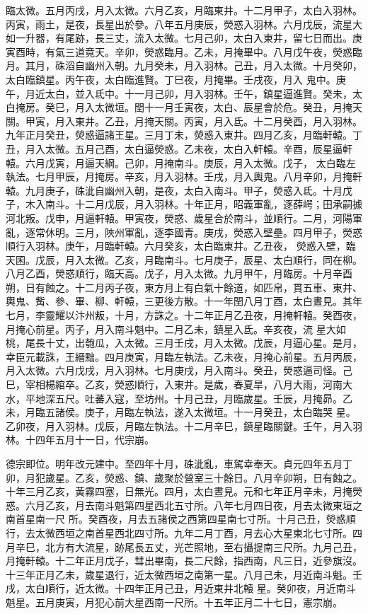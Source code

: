 \begin{pinyinscope}
 臨太微。五月丙戌，月入太微。六月乙亥，月臨東井。十二月甲子，太白入羽林。丙寅，雨土，是夜，長星出於參。八年五月庚辰，熒惑入羽林。六月戊辰，流星大如一升器，有尾跡，長三丈，流入太微。七月己卯，太白入東井，留七日而出。庚寅酉時，有氣三道竟天。辛卯，熒惑臨月。乙未，月掩畢中。八月戊午夜，熒惑臨月。其月，硃滔自幽州入朝。九月癸未，月入羽林。己丑，月入太微。十月癸卯，太白臨鎮星。丙午夜，太白臨進賢。丁巳夜，月掩畢。壬戌夜，月入
 鬼中。庚午，月近太白，並入氐中。十一月己卯，月入羽林。壬午，鎮星逼進賢。癸未，太白掩房。癸巳，月入太微垣。閏十一月壬寅夜，太白、辰星會於危。癸丑，月掩天關。甲寅，月入東井。乙丑，月掩天關。丙寅，月入氐。十二月癸酉，月入羽林。九年正月癸丑，熒惑逼諸王星。三月丁未，熒惑入東井。四月乙亥，月臨軒轅。丁丑，月入太微。五月己酉，太白逼熒惑。乙未夜，太白入軒轅。辛酉，辰星逼軒轅。六月戊寅，月逼天綱。己卯，月掩南斗。庚辰，月入太微。戊子，
 太白臨左執法。七月甲辰，月掩房。辛亥，月入羽林。壬戌，月入輿鬼。八月辛卯，月掩軒轅。九月庚子，硃泚自幽州入朝，是夜，太白入南斗。甲子，熒惑入氐。十月戊子，木入南斗。十二月戊辰，月入羽林。十年正月，昭義軍亂，逐薛崿；田承嗣據河北叛。戊申，月逼軒轅。甲寅夜，熒惑、歲星合於南斗，並順行。二月，河陽軍亂，逐常休明。三月，陜州軍亂，逐李國青。庚戌，熒惑入壁壘。四月甲子，熒惑順行入羽林。庚午，月臨軒轅。六月癸亥，太白臨東井。乙丑夜，
 熒惑入壁，臨天囷。戊辰，月入太微。乙亥，月臨南斗。七月庚子，辰星、太白順行，同在柳。八月乙酉，熒惑順行，臨天高。戊子，月入太微。九月甲午，月臨房。十月辛酉朔，日有蝕之。十二月丙子夜，東方月上有白氣十餘道，如匹帛，貫五車、東井、輿鬼、觜、參、畢、柳、軒轅，三更後方散。十一年閏八月丁酉，太白晝見。其年七月，李靈耀以汴州叛，十月，方誅之。十二年正月乙丑夜，月掩軒轅。癸酉夜，月掩心前星。丙子，月入南斗魁中。二月乙未，鎮星入氐。辛亥夜，流
 星大如桃，尾長十丈，出匏瓜，入太微。三月壬戌，月入太微。戊辰，月逼心星。是月，幸臣元載誅，王縉黜。四月庚寅，月臨左執法。乙未夜，月掩心前星。五月丙辰，月入太微。六月戊戌，月入羽林。七月庚戌，月入南斗。癸丑，熒惑逼司怪。己巳，宰相楊綰卒。乙亥，熒惑順行，入東井。是歲，春夏旱，八月大雨，河南大水，平地深五尺。吐蕃入寇，至坊州。十月己丑，月臨歲星。壬辰，月掩昴。乙未，月臨五諸侯。庚子，月臨左執法，遂入太微垣。十一月癸丑，太白臨哭
 星。乙卯夜，月入羽林。戊辰，月臨左執法。十二月辛巳，鎮星臨關鍵。壬午，月入羽林。十四年五月十一日，代宗崩。



 德宗即位。明年改元建中。至四年十月，硃泚亂，車駕幸奉天。貞元四年五月丁卯，月犯歲星。乙亥，熒惑、鎮、歲聚於營室三十餘日。八月辛卯朔，日有蝕之。十年三月乙亥，黃霧四塞，日無光。四月，太白晝見。元和七年正月辛未，月掩熒惑。六月乙亥，月去南斗魁第四星西北五寸所。八年七月四日夜，月去太微東垣之南首星南一尺
 所。癸酉夜，月去五諸侯之西第四星南七寸所。十月己丑，熒惑順行，去太微西垣之南首星西北四寸所。九年二月丁酉，月去心大星東北七寸所。四月辛巳，北方有大流星，跡尾長五丈，光芒照地，至右攝提南三尺所。九月己丑，月掩軒轅。十二年正月戊子，彗出畢南，長二尺餘，指西南，凡三日，近參旗沒。十三年正月乙未，歲星退行，近太微西垣之南第一星。八月己未，月近南斗魁。壬戌，太白順行，近太微。十四年正月己丑，月近東井北轅
 星。癸卯夜，月近南斗魁星。五月庚寅，月犯心前大星西南一尺所。十五年正月二十七日，憲宗崩。




\end{pinyinscope}

